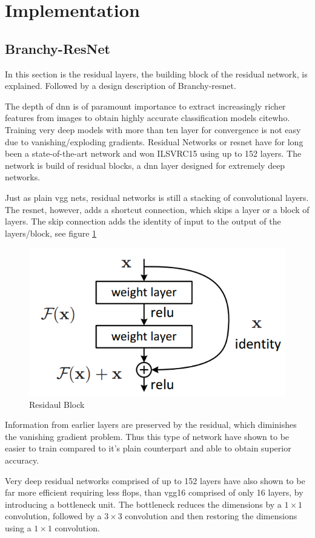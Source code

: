 \section{Implementation} \label{sec:ee-implementation}

\subsection{Branchy-ResNet} 

In this section is the residual layers, the building block of the residual network, is explained. Followed by a design description of Branchy-\gls{resnet}.

The depth of \gls{dnn} is of paramount importance to extract increasingly richer features from images to obtain highly accurate classification models cite{who}. Training very deep models with more than ten layer for convergence is not easy due to vanishing/exploding gradients. Residual Networks or \gls{resnet} \cite{he_deep_2015} have for long been a state-of-the-art network and won ILSVRC15 using up to 152 layers. The network is build of residual blocks, a \gls{dnn} layer designed for extremely deep networks. 

Just as plain \gls{vgg} nets, residual networks is still a stacking of  convolutional layers. The \gls{resnet}, however, adds a shortcut connection, which skips a layer or a block of layers. The skip connection adds the identity of input to the output of the layers/block, see figure \ref{fig:residualblock}

\begin{figure}
	\centering
	\includegraphics[width=.5\linewidth]{figures/models/residualblock}
	\caption[Residual Block]{Residaul Block}
	\label{fig:residualblock}
\end{figure}

Information from earlier layers are preserved by the residual, which diminishes the vanishing gradient problem. Thus this type of network have shown to be easier to train compared to it’s plain counterpart and able to obtain superior accuracy.  

Very deep residual networks comprised of up to 152 layers have also shown to be far more efficient requiring less \gls{flop}s, than \gls{vgg}16 comprised of only 16 layers, by introducing a bottleneck unit. The bottleneck reduces the dimensions by a $1 \times 1$ convolution, followed by a $3 \times 3$ convolution and then restoring the dimensions using a $1 \times 1$ convolution. 

